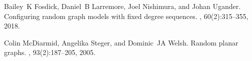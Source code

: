 \documentclass[12pt,twocolumn]{article}
\begin{document}
{\begin{thebibliography}{10}
Bailey~K Fosdick, Daniel~B Larremore, Joel Nishimura, and Johan Ugander.
\newblock Configuring random graph models with fixed degree sequences.
, 60(2):315--355, 2018.

Colin McDiarmid, Angelika Steger, and Dominic~JA Welsh.
\newblock Random planar graphs.
, 93(2):187--205,
  2005.

\end{thebibliography}

}
\end{document}
